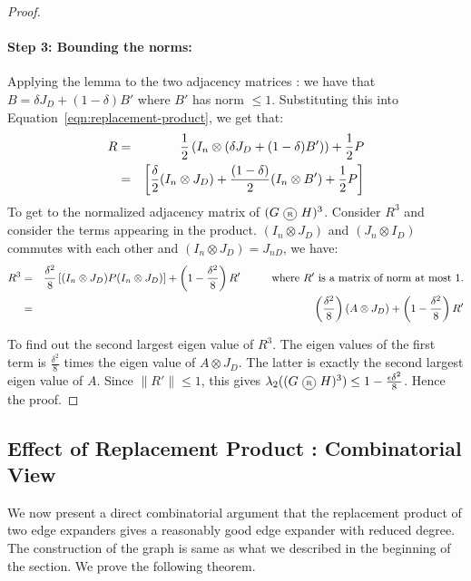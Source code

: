 \begin{proof}
\paragraph{\bf Step 3: Bounding the norms:}
Applying the lemma to the two adjacency matrices : we have that $B = \delta J_D + (1-\delta)B'$ where $B'$ has norm $\le 1$. Substituting this into Equation~\ref{eqn:replacement-product}, we get that:
\begin{eqnarray*}
R & = & \frac{1}{2} \left(I_n \otimes (\delta J_D + (1-\delta)B') \right) + \frac{1}{2} P\\
 & = & \left[ \frac{\delta}{2} (I_n \otimes J_D) + \frac{(1-\delta)}{2} (I_n \otimes B') + \frac{1}{2} P \right]
\end{eqnarray*}
To get to the normalized adjacency matrix of $(G \circled{R} H)^3$. Consider $R^3$ and consider the terms appearing in the product. $(I_n \otimes J_D)$ and $(J_n \otimes I_D)$ commutes with each other and $(I_n \otimes J_D) = J_{nD}$, we have:
\begin{eqnarray*}
R^3 & = & \frac{\delta^2}{8} \left[(I_n \otimes J_D)P(I_n \otimes J_D)\right] + \left(1-\frac{\delta^2}{8}\right) R' \textrm{\hspace{1cm}where $R'$ is a matrix of norm at most $1$.}\\
& = & \left( \frac{\delta^2}{8} \right) (A \otimes J_{D})+\left(1-\frac{\delta^2}{8}\right)R'
\end{eqnarray*}

\noindent To find out the second largest eigen value of $R^3$. The eigen values of the first term is $\frac{\delta^2}{8}$ times the eigen value of $A \otimes J_D$. The latter is exactly the second largest eigen value of $A$. Since $\|R'\| \le 1$, 
this gives $\lambda_2((G \circled{R} H)^3) \le 1-\frac{\epsilon\delta^2}{8}$. Hence the proof.
\end{proof}

\subsection{Effect of Replacement Product : Combinatorial View}

We now present a direct combinatorial argument that the replacement product of two edge expanders gives a reasonably good edge expander with reduced degree. The construction of the graph is same as what we described in the beginning of the section.
We prove the following theorem.

